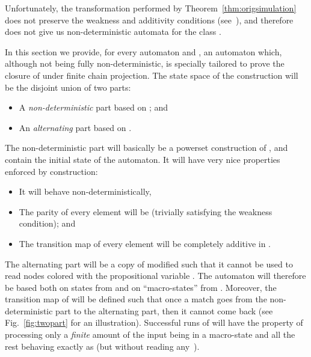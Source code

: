 Unfortunately, the transformation performed by Theorem~\ref{thm:origsimulation} does not preserve the weakness and additivity conditions (see~\cite[Remark~3.5]{Zanasi:Thesis:2012}), and therefore does not give us non-deterministic automata for the class .

In this section we provide, for every automaton  and , an automaton  which, although not being fully non-deterministic, is specially tailored to prove the closure of  under finite chain projection.
The state space of the construction  will be the disjoint union of two parts:
\begin{itemize}
	 pt 
	\item A \emph{non-deterministic} part based on ; and
	\item An \emph{alternating} part based on .
\end{itemize}
The non-deterministic part will basically be a powerset construction of , and contain the initial state of the automaton. It will have very nice properties enforced by construction:
\begin{itemize}
 	 pt
 	\item It will behave non-deterministically,
 	\item The parity of every element will be  (trivially satisfying the weakness condition); and 
 	\item The transition map of every element will be completely additive in .
\end{itemize} 
The alternating part will be a copy of  modified such that it cannot be used to read nodes colored with the propositional variable . The automaton  will therefore be based both on states from  and on ``macro-states'' from . Moreover, the transition map of  will be defined such that once a match goes from the non-deterministic part to the alternating part, then it cannot come back (see Fig.~\ref{fig:twopart} for an illustration). Successful runs of  will have the property of processing only a \emph{finite} amount of the input being in a macro-state and all the rest behaving exactly as  (but without reading any~).



